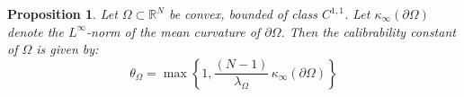 \documentclass[reqno,11pt]{amsart}
\newtheorem{proposition}[theorem]{Proposition}
\theoremstyle{definition}
\newtheorem{remark}[theorem]{Remark}
\numberwithin{equation}{section}
\def\ov{\overline}
\newcommand{\RR}{\mathbb{R}}
\newcommand{\1}{{{\bf 1}\kern-0,28em\rm l}}
\def\O{\Omega}
\def\l{\lambda}
\begin{document}
\begin{proposition}\label{chathetacalib}
Let $\Omega\subset\RR^N$ be convex, bounded of class $C^{1,1}$. Let  $\kappa_\infty(\partial \Omega)$ denote the $L^\infty$-norm of the mean curvature of $\partial \Omega$. Then the calibrability constant of $\O$ is given by: 
\begin{equation}\label{tcalib=}
\theta_\O = \max \left\{1, \frac{(N-1)}{\l_\O}\, \kappa_\infty(\partial \Omega) \right\}
\end{equation}
\end{proposition}
%
%
%
%
%
\end{document}
